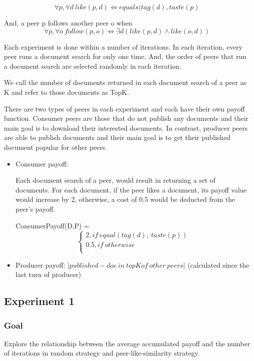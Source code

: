 \documentclass [12pt]{article} \usepackage{multicol}
\begin{document}
	$$ \forall p, \forall d   \ like(p,d)
	\Leftrightarrow   equals(tag(d), taste(p)\   $$

	 And, a peer p follows another peer o when 
	 $$  \forall p, \forall o \ follow(p, o) \Leftrightarrow  \exists d  (like(p,d)  \wedge like(o, d)) \ $$


	Each experiment is done within a number of iterations. In each iteration, 
	every peer runs a document search for  only one time. And, the order of peers that run a document search are selected
randomly in each iteration. 

We call the number of documents returned in each document search of a peer as K and refer
to those documents as TopK.

	There are two types of peers in each experiment and each have their own payoff function. 
	Consumer peers are those that do not publish any documents and their main goal is to download their interested documents.
	In contrast, producer peers are able to publish documents and their main goal is to get their published document popular for other
	peers. 
	 
    \begin{itemize}
    \item Consumer payoff:
    
    Each document search of a peer, would result in returning a set
of documents. For each document, if the peer likes a document, its
payoff value would increase by 2, otherwise, a cost of 0.5 would be
deducted from the peer's payoff.
 
 ConsumerPayoff(D,P) =
 \[    
\begin{cases}
2,  if\  equal(tag(d),\ taste(p))\\
0.5, if\  otherwise\\
\end{cases}
 \]	
 	
\item Producer payoff: ${| published-doc\ in\ topK of\ other \ peers|}$ (calculated since the last turn of producer)	

\end{itemize}

\subsection{Experiment 1}

\subsubsection{Goal} Explore the relationship between the
average accumulated payoff and the number of iterations in random
strategy and peer-like-similarity strategy.
\end{document}
